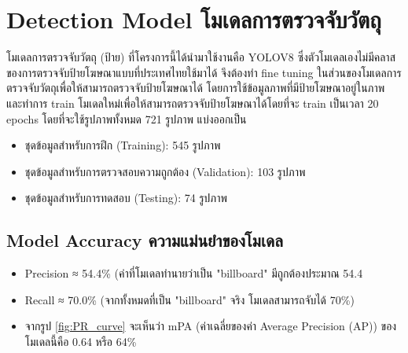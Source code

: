 \clearpage

\section{\ifenglish Detection Model \else โมเดลการตรวจจับวัตถุ \fi}
\ifenglish \else
โมเดลการตรวจจับวัตถุ (ป้าย) ที่โครงการนี้ได้นำมาใช้งานคือ YOLOV8 ซึ่งตัวโมเดลเองไม่มีคลาสของการตรวจจับป้ายโฆษณาแบบที่ประเทศไทยใช้มาได้ จึงต้องทำ fine tuning ในส่วนของโมเดลการตรวจจับวัตถุเพื่อให้สามารถตรวจจับป้ายโฆษณาได้ โดยการใช้ข้อมูลภาพที่มีป้ายโฆษณาอยู่ในภาพ และทำการ train โมเดลใหม่เพื่อให้สามารถตรวจจับป้ายโฆษณาได้โดยที่จะ train เป็นเวลา 20 epochs โดยที่จะใช้รูปภาพทั้งหมด 721 รูปภาพ แบ่งออกเป็น
\begin{itemize}
    \item ชุดข้อมูลสำหรับการฝึก (Training): 545 รูปภาพ
    \item ชุดข้อมูลสำหรับการตรวจสอบความถูกต้อง (Validation): 103 รูปภาพ
    \item ชุดข้อมูลสำหรับการทดสอบ (Testing): 74 รูปภาพ
\end{itemize}
\fi

\subsection{\ifenglish Model Accuracy \else ความแม่นยำของโมเดล \fi}
\ifenglish \else
\begin{itemize}
    \item Precision ≈ 54.4\% (ค่าที่โมเดลทำนายว่าเป็น "billboard" มีถูกต้องประมาณ 54.4%
    \item Recall ≈ 70.0\% (จากทั้งหมดที่เป็น "billboard" จริง โมเดลสามารถจับได้ 70\%)
    \item จากรูป \ref{fig:PR_curve} จะเห็นว่า mPA (ค่าเฉลี่ยของค่า Average Precision (AP)) ของโมเดลนี้คือ 0.64 หรือ 64\%
\end{itemize}
\fi

